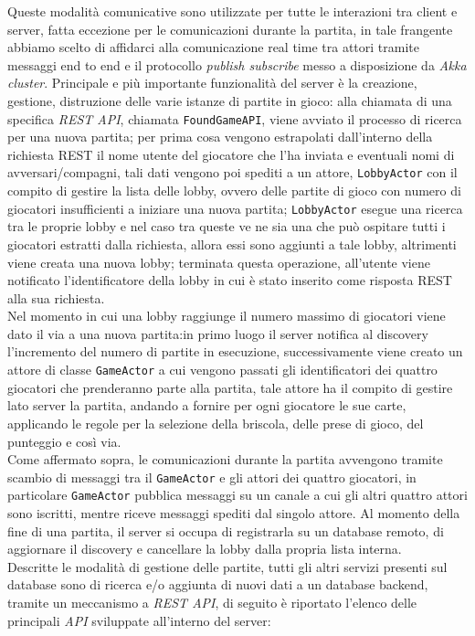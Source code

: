  Queste modalità comunicative sono utilizzate per tutte le interazioni tra client e server, fatta eccezione per le comunicazioni durante la partita, in tale frangente abbiamo scelto di affidarci alla comunicazione real time tra attori tramite messaggi end to end e il protocollo \textit{publish subscribe} messo a disposizione da \textit{Akka cluster}.
 Principale e più importante funzionalità del server è la creazione, gestione, distruzione delle varie istanze di partite in gioco:
 alla chiamata di una specifica \textit{REST API}, chiamata \texttt{FoundGameAPI}, viene avviato il processo di ricerca per una nuova partita; per prima cosa vengono estrapolati dall'interno della richiesta REST il nome utente del giocatore che l'ha inviata e eventuali nomi di avversari/compagni, tali dati vengono poi spediti a un attore, \texttt{LobbyActor} con il compito di gestire la lista delle lobby, ovvero delle partite di gioco con numero di giocatori insufficienti a iniziare una nuova partita; \texttt{LobbyActor} esegue una ricerca tra le proprie lobby e  nel caso tra queste ve ne sia una che può ospitare tutti i giocatori estratti dalla richiesta, allora essi sono aggiunti a tale lobby, altrimenti viene creata una nuova lobby; terminata questa operazione, all'utente viene notificato l'identificatore della lobby in cui è stato inserito come risposta REST alla sua richiesta. \\
 Nel momento in cui una lobby raggiunge il numero massimo di giocatori viene dato il via a una nuova partita:in primo luogo il server notifica al discovery l'incremento del numero di partite in esecuzione, successivamente viene creato un attore di classe \texttt{GameActor} a cui vengono passati gli identificatori dei quattro giocatori che prenderanno parte alla partita, tale attore ha il compito di gestire lato server la partita, andando a fornire per ogni giocatore le sue carte, applicando le regole per la selezione della briscola, delle prese di gioco, del punteggio e così via.\\
 Come affermato sopra, le comunicazioni durante la partita avvengono tramite scambio di messaggi tra il \texttt{GameActor} e gli attori dei quattro giocatori, in particolare \texttt{GameActor} pubblica messaggi su un canale a cui gli altri quattro attori sono iscritti, mentre riceve messaggi spediti dal singolo attore.
 Al momento della fine di una partita, il server si occupa di registrarla su un database remoto, di aggiornare il discovery e cancellare la lobby dalla propria lista interna.\\
 Descritte le modalità di gestione delle partite, tutti gli altri servizi presenti sul database sono di ricerca e/o aggiunta di nuovi dati a un database backend, tramite un meccanismo a \textit{REST API}, di seguito è riportato l'elenco delle principali \textit{API} sviluppate all'interno del server:
